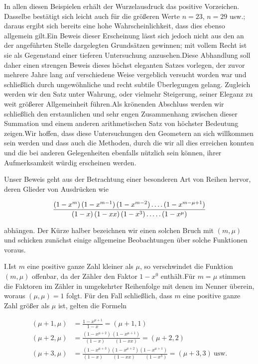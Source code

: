 
In allen diesen Beispielen erhält der Wurzelausdruck das positive Vorzeichen. Dasselbe bestätigt sich leicht auch für die größeren Werte $n=23$, $n=29$ usw.; daraus ergibt sich bereits eine hohe Wahrscheinlichkeit, dass dies ebenso allgemein gilt.\quad Ein Beweis dieser Erscheinung lässt sich jedoch nicht aus den an der angeführten Stelle dargelegten Grundsätzen gewinnen; mit vollem Recht ist sie als Gegenstand einer tieferen Untersuchung anzusehen.\quad Diese Abhandlung soll daher einen strengen Beweis dieses höchst eleganten Satzes vorlegen, der zuvor mehrere Jahre lang auf verschiedene Weise vergeblich versucht worden war und schließlich durch ungewöhnliche und recht subtile Überlegungen gelang. Zugleich werden wir den Satz unter Wahrung, oder vielmehr Steigerung, seiner Eleganz zu weit größerer Allgemeinheit führen.\quad Als krönenden Abschluss werden wir schließlich den erstaunlichen und sehr engen Zusammenhang zwischen dieser Summation und einem anderen arithmetischen Satz von höchster Bedeutung zeigen.\quad Wir hoffen, dass diese Untersuchungen den Geometern an sich willkommen sein werden und dass auch die Methoden, durch die wir all dies erreichen konnten und die bei anderen Gelegenheiten ebenfalls nützlich sein können, ihrer Aufmerksamkeit würdig erscheinen werden.


Unser Beweis geht aus der Betrachtung einer besonderen Art von Reihen hervor, deren Glieder von Ausdrücken wie

\[
\begin{aligned}
\frac{(1-x^m)\,(1-x^{m-1})\,(1-x^{m-2})\mathinner{.\,.\,.\,.}(1-x^{m-\mu+1})}{(1-x)\,(1-xx)\,(1-x^3)\mathinner{.\,.\,.\,.\,.}(1-x^\mu)}
\end{aligned}
\]

abhängen. Der Kürze halber bezeichnen wir einen solchen Bruch mit $(m,\mu)$ und schicken zunächst einige allgemeine Beobachtungen über solche Funktionen voraus.

I.\quad Ist $m$ eine positive ganze Zahl kleiner als $\mu$, so verschwindet die Funktion $(m,\mu)$ offenbar, da der Zähler den Faktor $1-x^0$ enthält.\quad Für $m=\mu$ stimmen die Faktoren im Zähler in umgekehrter Reihenfolge mit denen im Nenner überein, woraus $(\mu,\mu)=1$ folgt. Für den Fall schließlich, dass $m$ eine positive ganze Zahl größer als $\mu$ ist, gelten die Formeln

\[
\begin{aligned}
(\mu+1,\mu)&=\frac{1-x^{\mu+1}}{1-x}=(\mu+1,1)\\
(\mu+2,\mu)&=\frac{(1-x^{\mu+2})\,(1-x^{\mu+1})}{(1-x)\qquad(1-xx)}=(\mu+2,2)\\
(\mu+3,\mu)&=\frac{(1-x^{\mu+3})(1-x^{\mu+2})(1-x^{\mu+1})}{(1-x)\qquad(1-xx)\qquad(1-x^3)}=(\mu+3,3)\ \text{usw.}
\end{aligned}
\]

